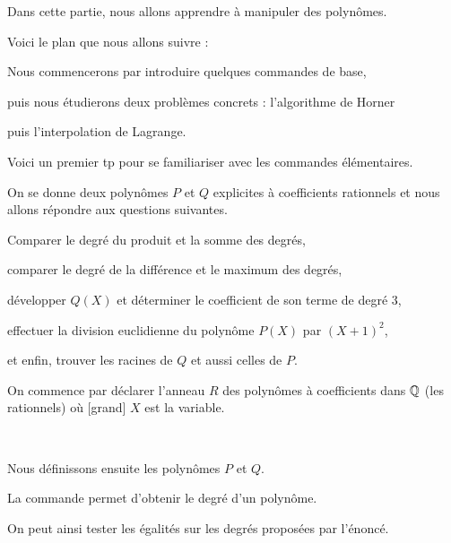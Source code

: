 






\debuttexte


\diapo

Dans cette partie, nous allons apprendre à manipuler des polynômes.

\change
Voici le plan que nous allons suivre :

\change
Nous commencerons par introduire quelques commandes de base,

\change
puis nous étudierons deux problèmes concrets : l'algorithme de Horner 

\change 
puis l'interpolation de Lagrange.



\diapo

Voici un premier tp pour se familiariser avec les commandes élémentaires.

On se donne deux polynômes $P$ et $Q$ explicites à coefficients rationnels et nous allons répondre aux questions suivantes.

\change
Comparer le degré du produit et la somme des degrés,

\change
comparer le degré de la différence  et le maximum des degrés,

\change 
développer $Q(X)$ et déterminer le coefficient de son terme de degré $3$,

\change 
effectuer la division euclidienne du polynôme $P(X)$ par $(X+1)^2$,

\change 
et enfin, trouver les racines de $Q$ et aussi celles de $P$.

\diapo

\change  
On commence par déclarer l'anneau $R$ des polynômes à coefficients dans $\mathbb{Q}$ (les rationnels) 
où [grand] $X$ est la variable. 

~

Nous définissons ensuite les polynômes $P$ et $Q$.

\change

\change
La commande  permet d'obtenir le degré d'un polynôme.


On peut ainsi tester les égalités sur les degrés proposées par l'énoncé.
  
